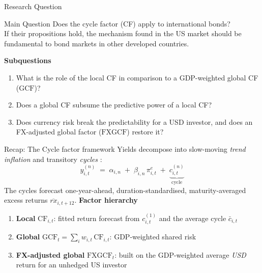 \documentclass[10pt]{beamer}
\newcommand{\CF}{\mathrm{CF}}
\newcommand{\GCF}{\mathrm{GCF}}
\newcommand{\FXGCF}{\mathrm{FXGCF}}
\newcommand{\rxbar}{\overline{rx}}
\begin{document}
\begin{frame}{Research Question}
  \begin{block}{Main Question}
    Does the \citet{cieslak2015} cycle factor (CF) apply to international
    bonds?\\
    {\small\color{gray} If their propositions hold, the mechanism found in the
    US market should be fundamental to bond markets in other developed
    countries.}
  \end{block}
  \textbf{Subquestions}
  \begin{enumerate}
    \item What is the role of the local CF in comparison to a GDP-weighted
      global CF ($\GCF$)?
    \item Does a global CF subsume the predictive power of a local CF?
    \item Does currency risk break the predictability for a USD investor, and
      does an FX-adjusted global factor ($\FXGCF$) restore it?
  \end{enumerate}
\end{frame}

\begin{frame}{Recap: The Cycle factor framework}
  Yields decompose into slow-moving \emph{trend inflation} and transitory
  \emph{cycles} \citep{cieslak2015}:
  \begin{equation*}
    y^{(n)}_{i,t} \;=\; \alpha_{i,n} \;+\; \beta_{i,n}\,\pi^{e}_{i,t}
      \;+\; \underbrace{c^{(n)}_{i,t}}_{\text{cycle}}
  \end{equation*}
  The cycles forecast one-year-ahead, duration-standardised,
  maturity-averaged excess returns $\rxbar_{i,t+12}$.
  \vfill
  \textbf{Factor hierarchy}
  \begin{enumerate}
    \item \textbf{Local} $\CF_{i,t}$: fitted return forecast from
      $c^{(1)}_{i,t}$ and the average cycle $\bar c_{i,t}$
    \item \textbf{Global} $\GCF_{t} = \sum_{i} w_{i,t}\,\CF_{i,t}$:
      GDP-weighted shared risk \citep{dahlquist2013}
    \item \textbf{FX-adjusted global} $\FXGCF_{t}$: built on the GDP-weighted
      average \emph{USD} return for an unhedged US investor
  \end{enumerate}
\end{frame}

\end{document}
